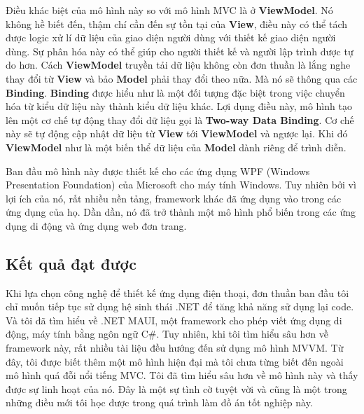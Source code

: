 \documentclass[../DoAn.tex]{subfiles}
\begin{document}
Điều khác biệt của mô hình này so với mô hình MVC là ở \textbf{ViewModel}. Nó không hề biết đến, thậm chí cần đến sự tồn tại của \textbf{View}, điều này có thể tách được logic xử lí dữ liệu của giao diện người dùng với thiết kế giao diện người dùng. Sự phân hóa này có thể giúp cho người thiết kế và người lập trình được tự do hơn. Cách \textbf{ViewModel} truyền tải dữ liệu không còn đơn thuần là lắng nghe thay đổi từ \textbf{View} và bảo \textbf{Model} phải thay đổi theo nữa. Mà nó sẽ thông qua các \textbf{Binding}. \textbf{Binding} được hiểu như là một đối tượng đặc biệt trong việc chuyển hóa từ kiểu dữ liệu này thành kiểu dữ liệu khác. Lợi dụng điều này, mô hình tạo lên một cơ chế tự động thay đổi dữ liệu gọi là \textbf{Two-way Data Binding}. Cơ chế này sẽ tự động cập nhật dữ liệu từ \textbf{View} tới \textbf{ViewModel} và ngược lại. Khi đó \textbf{ViewModel} như là một biến thể dữ liệu của \textbf{Model} dành riêng để trình diễn.

Ban đầu mô hình này được thiết kế cho các ứng dụng WPF (Windows Presentation Foundation) của Microsoft cho máy tính Windows. Tuy nhiên bởi vì lợi ích của nó, rất nhiều nền tảng, framework khác đã ứng dụng vào trong các ứng dụng của họ. Dần dần, nó đã trở thành một mô hình phổ biến trong các ứng dụng di động và ứng dụng web đơn trang.


\subsection{Kết quả đạt được}
\label{subsection:mvvm-result}
Khi lựa chọn công nghệ để thiết kế ứng dụng điện thoại, đơn thuần ban đầu tôi chỉ muốn tiếp tục sử dụng hệ sinh thái .NET để tăng khả năng sử dụng lại code. Và tôi đã tìm hiểu về .NET MAUI, một framework cho phép viết ứng dụng di động, máy tính bằng ngôn ngữ C\#. Tuy nhiên, khi tôi tìm hiểu sâu hơn về framework này, rất nhiều tài liệu đều hướng đến sử dụng mô hình MVVM. Từ đây, tôi được biết thêm một mô hình hiện đại mà tôi chưa từng biết đến ngoài mô hình quá đỗi nổi tiếng MVC. Tôi đã tìm hiểu sâu hơn về mô hình này và thấy được sự linh hoạt của nó. Đây là một sự tình cờ tuyệt vời và cũng là một trong những điều mới tôi học được trong quá trình làm đồ án tốt nghiệp này.
\end{document}
